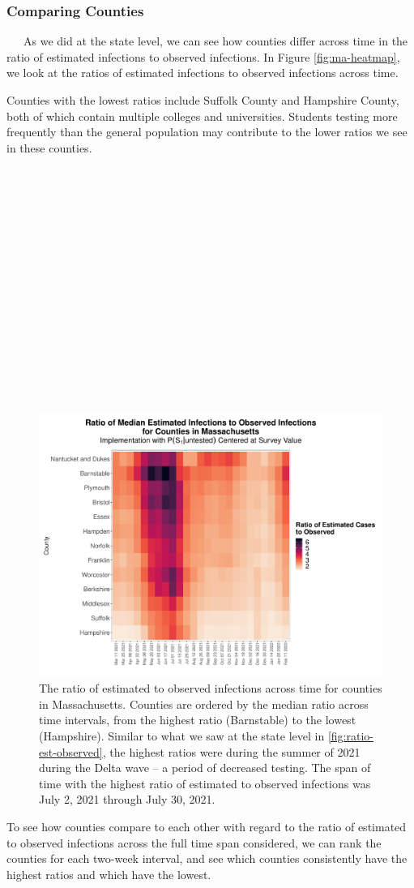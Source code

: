 \documentclass[12pt,twoside]{smiththesis}
\begin{document}
\hypertarget{comparing-counties}{%
\subsubsection{Comparing Counties}\label{comparing-counties}}

~~~As we did at the state level, we can see how counties differ across time in the ratio of estimated infections to observed infections. In Figure \ref{fig:ma-heatmap}, we look at the ratios of estimated infections to observed infections across time.

Counties with the lowest ratios include Suffolk County and Hampshire County, both of which contain multiple colleges and universities. Students testing more frequently than the general population may contribute to the lower ratios we see in these counties.

~

~

~

~

~

~

~

~

~
\begin{figure}
\includegraphics[width=1\linewidth]{figure/ma_county_heatmap_ratio_est_observed} \caption{\label{fig:ma-heatmap} The ratio of estimated to observed infections across time for counties in Massachusetts. Counties are ordered by the median ratio across time intervals, from the highest ratio (Barnstable) to the lowest (Hampshire). Similar to what we saw at the state level in \ref{fig:ratio-est-observed}, the highest ratios were during the summer of 2021 during the Delta wave -- a period of decreased testing. The span of time with the highest ratio of estimated to observed infections was July 2, 2021 through July 30, 2021.}\label{fig:unnamed-chunk-83}
\end{figure}
To see how counties compare to each other with regard to the ratio of estimated to observed infections across the full time span considered, we can rank the counties for each two-week interval, and see which counties consistently have the highest ratios and which have the lowest.
\end{document}
